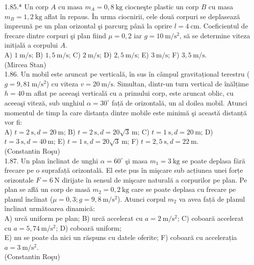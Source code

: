 1.85.* Un corp $A$ cu masa $m_{A}=0,8 \mathrm{~kg}$ ciocneşte plastic un corp $B$ cu masa $m_{B}=1,2 \mathrm{~kg}$ aflat în repaus. În urma ciocnirii, cele două corpuri se deplasează împreună pe un plan orizontal şi parcurg până la oprire $l=4 \mathrm{~cm}$. Coeficientul de frecare dintre corpuri şi plan fiind $\mu=0,2$ iar $g=10 \mathrm{~m} / \mathrm{s}^{2}$, să se determine viteza initịală a corpului $A$.\\ A) $1 \mathrm{~m} / \mathrm{s}$; B) $1,5 \mathrm{~m} / \mathrm{s}$; C) $2 \mathrm{~m} / \mathrm{s}$; D) $2,5 \mathrm{~m} / \mathrm{s}$; E) $3 \mathrm{~m} / \mathrm{s}$; F) $3,5 \mathrm{~m} / \mathrm{s}$.\\ (Mircea Stan)\\

1.86. Un mobil este aruncat pe verticală, în sus în câmpul gravitațional terestru ($g=9,81 \mathrm{~m} / \mathrm{s}^{2}$) cu viteza $v=20 \mathrm{~m} / \mathrm{s}$. Simultan, dintr-un turn vertical de înălțime $h=40 \mathrm{~m}$ aflat pe aceeaşi verticală cu a primului corp, este aruncat oblic, cu aceeaşi viteză, sub unghiul $\alpha=30^{\circ}$ față de orizontală, un al doilea mobil. Atunci momentul de timp la care distanța dintre mobile este minimă şi această distanță vor fi:\\ A) $t=2 \mathrm{~s}, d=20 \mathrm{~m}$; B) $t=2 \mathrm{~s}, d=20 \sqrt{3} \mathrm{~m}$; C) $t=1 \mathrm{~s}, d=20 \mathrm{~m}$; D) $t=3 \mathrm{~s}, d=40 \mathrm{~m}$; E) $t=1 \mathrm{~s}, d=20 \sqrt{3} \mathrm{~m}$; F) $t=2,5 \mathrm{~s}, d=22 \mathrm{~m}$.\\ (Constantin Roşu)\\

1.87. Un plan înclinat de unghi $\alpha=60^{\circ}$ şi masa $m_{1}=3 \mathrm{~kg}$ se poate deplasa fără frecare pe o suprafață orizontală. El este pus în mişcare sub acțiunea unei forțe orizontale $F=6 \mathrm{~N}$ dirijate în sensul de mişcare naturală a corpurilor pe plan. Pe plan se află un corp de masă $m_{2}=0,2 \mathrm{~kg}$ care se poate deplasa cu frecare pe planul înclinat ($\mu=0,3 ; g=9,8 \mathrm{~m} / \mathrm{s}^{2}$). Atunci corpul $m_{2}$ va avea față de planul înclinat următoarea dinamică:\\ A) urcă uniform pe plan; B) urcă accelerat cu $a=2 \mathrm{~m} / \mathrm{s}^{2}$; C) coboară accelerat cu $a=5,74 \mathrm{~m} / \mathrm{s}^{2}$; D) coboară uniform;\\ E) nu se poate da nici un răspuns cu datele oferite; F) coboară cu accelerația $a=3 \mathrm{~m} / \mathrm{s}^{2}$.\\ (Constantin Roşu)\\

